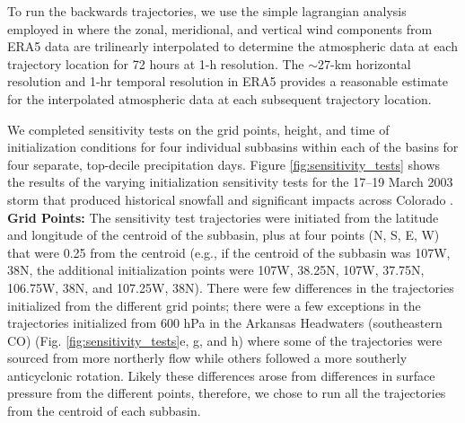 \documentclass[draft]{agujournal2019}
\begin{document}
To run the backwards trajectories, we use the simple lagrangian analysis employed in  where the zonal, meridional, and vertical wind components from ERA5 data are trilinearly interpolated to determine the atmospheric data at each trajectory location for 72 hours at 1-h resolution. The $\sim$27-km horizontal resolution and 1-hr temporal resolution in ERA5 provides a reasonable estimate for the interpolated atmospheric data at each subsequent trajectory location.

We completed sensitivity tests on the grid points, height, and time of initialization conditions for four individual subbasins within each of the basins for four separate, top-decile precipitation days. Figure \ref{fig:sensitivity_tests} shows the results of the varying initialization sensitivity tests for the 17--19 March 2003 storm that produced historical snowfall and significant impacts across Colorado \cite{Wesley2013Extreme2003}. \textbf{Grid Points:} The sensitivity test trajectories were initiated from the latitude and longitude of the centroid of the subbasin, plus at four points (N, S, E, W) that were 0.25\textdegree{} from the centroid (e.g., if the centroid of the subbasin was 107\textdegree W, 38\textdegree N, the additional initialization points were 107\textdegree W, 38.25\textdegree N, 107\textdegree W, 37.75\textdegree N, 106.75\textdegree W, 38\textdegree N, and 107.25\textdegree W, 38\textdegree N). There were few differences in the trajectories initialized from the different grid points; there were a few exceptions in the trajectories initialized from 600 hPa in the Arkansas Headwaters (southeastern CO) (Fig. \ref{fig:sensitivity_tests}e, g, and h) where some of the trajectories were sourced from more northerly flow while others followed a more southerly anticyclonic rotation. Likely these differences arose from differences in surface pressure from the different points, therefore, we chose to run all the trajectories from the centroid of each subbasin.
\end{document}
